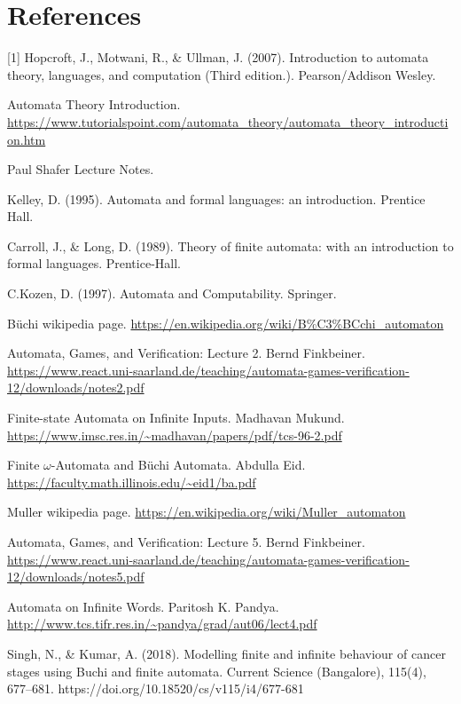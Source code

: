 \documentclass[a4paper,12pt]{report}
\theoremstyle{definition}
\begin{document}
\chapter{References}
[1] Hopcroft, J., Motwani, R., \& Ullman, J. (2007). Introduction to automata theory, languages, and computation  (Third edition.). Pearson/Addison Wesley.


\noindent[2] Automata Theory Introduction. \url{https://www.tutorialspoint.com/automata_theory/automata_theory_introduction.htm}

\noindent[3] Paul Shafer Lecture Notes.

\noindent[4] Kelley, D. (1995). Automata and formal languages: an introduction. Prentice Hall.

\noindent[5] Carroll, J., \& Long, D. (1989). Theory of finite automata: with an introduction to formal languages. Prentice-Hall.

\noindent[6] C.Kozen, D. (1997). Automata and Computability. Springer.

\noindent[7]  Büchi wikipedia page. \url{https://en.wikipedia.org/wiki/B%C3%BCchi_automaton}

\noindent[8] Automata, Games, and Verification: Lecture 2.
Bernd Finkbeiner.
\url{https://www.react.uni-saarland.de/teaching/automata-games-verification-12/downloads/notes2.pdf}

\noindent[9] Finite-state Automata on Infinite Inputs.
Madhavan Mukund.
\url{https://www.imsc.res.in/~madhavan/papers/pdf/tcs-96-2.pdf}

\noindent[10] Finite $\omega$-Automata and Büchi Automata.
Abdulla Eid.
\url{https://faculty.math.illinois.edu/~eid1/ba.pdf}

\noindent[11] Muller wikipedia page.
\url{https://en.wikipedia.org/wiki/Muller_automaton}

\noindent[12] Automata, Games, and Verification: Lecture 5.
Bernd Finkbeiner.
\url{ https://www.react.uni-saarland.de/teaching/automata-games-verification-12/downloads/notes5.pdf}

\noindent[13] Automata on Infinite Words.
Paritosh K. Pandya.
\url{http://www.tcs.tifr.res.in/~pandya/grad/aut06/lect4.pdf}

\noindent[14] Singh, N., \& Kumar, A. (2018). Modelling finite and infinite behaviour of cancer stages using Buchi and finite automata. Current Science (Bangalore), 115(4), 677–681. https://doi.org/10.18520/cs/v115/i4/677-681
\end{document}
